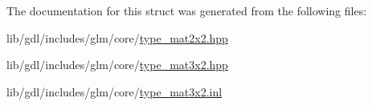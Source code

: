 The documentation for this struct was generated from the following files\+:\begin{DoxyCompactItemize}
\item 
lib/gdl/includes/glm/core/\hyperlink{type__mat2x2_8hpp}{type\+\_\+mat2x2.\+hpp}\item 
lib/gdl/includes/glm/core/\hyperlink{type__mat3x2_8hpp}{type\+\_\+mat3x2.\+hpp}\item 
lib/gdl/includes/glm/core/\hyperlink{type__mat3x2_8inl}{type\+\_\+mat3x2.\+inl}\end{DoxyCompactItemize}
